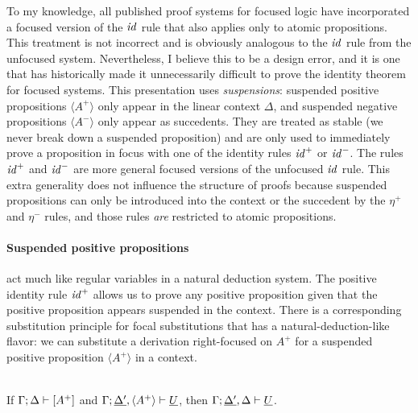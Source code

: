 To my knowledge, all published proof systems for focused logic have
incorporated a focused version of the ${\it id}$ rule that also
applies only to atomic propositions. This treatment is not incorrect
and is obviously analogous to the ${\it id}$ rule from the unfocused
system. Nevertheless, I believe this to be a design error, and it is
one that has historically made it unnecessarily difficult to prove the
identity theorem for focused systems. This presentation uses {\it
  suspensions}: suspended positive propositions $\langle A^+ \rangle$
only appear in the linear context $\Delta$, and suspended negative
propositions $\langle A^- \rangle$ only appear as succedents. They are
treated as stable (we never break down a suspended proposition) and
are only used to immediately prove a proposition in focus with one of
the identity rules ${\it id}^+$ or ${\it id}^-$. The rules ${\it
  id}^+$ and ${\it id}^-$ are more general focused versions of the
unfocused ${\it id}$ rule. This extra generality does not influence
the structure of proofs because suspended propositions can only be
introduced into the context or the succedent by the $\eta^+$ and
$\eta^-$ rules, and those rules {\it are} restricted to atomic
propositions.

\paragraph{Suspended positive propositions} act much like regular variables in a
natural deduction system. The positive identity rule ${\it id}^+$
allows us to prove any positive proposition given that the positive
proposition appears suspended in the context.  There is a
corresponding substitution principle for focal substitutions that has
a natural-deduction-like flavor: we can substitute a derivation
right-focused on $A^+$ for a suspended positive proposition $\langle
A^+ \rangle$ in a context.

\bigskip
\begin{theorem}\label{thm:fsubst-pos}~\\
If ${\Gamma};{\Delta} \vdash {[A^+]} \mathstrut$ 
and ${\Gamma};{\underline{\Delta'}, \langle A^+ \rangle} \vdash {\underline{U}} \mathstrut$, 
then ${\Gamma};{\underline{\Delta'}, \Delta} \vdash {\underline{U}} \mathstrut$.
\end{theorem}

